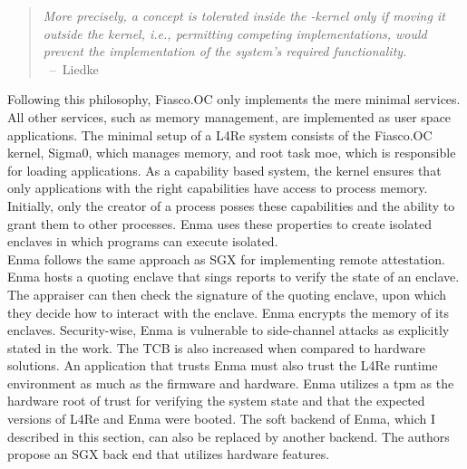 \begin{quote}
    \textit{ More precisely, a concept is tolerated inside the \mu-kernel only
        if moving it outside the kernel, i.e., permitting competing
        implementations, would prevent the implementation of the system's
        required functionality. \\
    } \mbox{ -- Liedke\cite{liedtke1995micro}}
\end{quote}

Following this philosophy, Fiasco.OC only implements the mere minimal services.
All other services, such as memory management, are implemented as user space
applications. The minimal setup of a L4Re system consists of the Fiasco.OC
kernel, Sigma0, which manages memory, and root task moe, which is responsible
for loading applications. As a capability based system, the kernel ensures that
only applications with the right capabilities have access to process memory.
Initially, only the creator of a process posses these capabilities and the
ability to grant them to other processes. Enma uses these properties to create
isolated enclaves in which programs can execute isolated.\\

Enma follows the same approach as SGX for implementing remote attestation. Enma
hosts a quoting enclave that sings reports to verify the state of an enclave.
The appraiser can then check the signature of the quoting enclave, upon which
they decide how to interact with the enclave. Enma encrypts the memory of its
enclaves. Security-wise, Enma is vulnerable to side-channel attacks as
explicitly stated in the work. The TCB is also increased when compared to
hardware solutions. An application that trusts Enma must also trust the L4Re
runtime environment as much as the firmware and hardware. Enma utilizes a
\gls{tpm} as the hardware root of trust for verifying the system state and that
the expected versions of L4Re and Enma were booted. The soft backend of Enma,
which I described in this section, can also be replaced by another backend. The
authors propose an SGX back end that utilizes hardware features.

